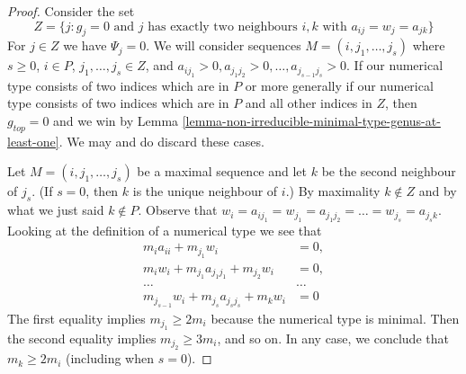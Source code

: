 \begin{proof}
\medskip\noindent
Consider the set
$$
Z = \{j : g_j = 0\text{ and }
j\text{ has exactly two neighbours }i, k\text{ with }
a_{ij} = w_j = a_{jk}\}
$$
For $j \in Z$ we have $\Psi_j = 0$. We will consider sequences
$M = (i, j_1, \ldots, j_s)$ where $s \geq 0$,
$i \in P$, $j_1, \ldots, j_s \in Z$, and
$a_{ij_1} > 0, a_{j_1j_2} > 0, \ldots, a_{j_{s - 1}j_s} > 0$.
If our numerical type consists of two indices which are in $P$
or more generally if our numerical type consists of
two indices which are in $P$ and all other indices in $Z$, then
$g_{top} = 0$ and we win by
Lemma \ref{lemma-non-irreducible-minimal-type-genus-at-least-one}.
We may and do discard these cases.

\medskip\noindent
Let $M = (i, j_1, \ldots, j_s)$ be a maximal sequence and let
$k$ be the second neighbour of $j_s$. (If $s = 0$, then $k$
is the unique neighbour of $i$.) By maximality $k \not \in Z$
and by what we just said $k \not \in P$. Observe that
$w_i = a_{ij_1} = w_{j_1} = a_{j_1j_2} = \ldots = w_{j_s} =
a_{j_sk}$. Looking at the definition
of a numerical type we see that
\begin{align*}
m_ia_{ii} + m_{j_1}w_i & = 0,\\
m_iw_i + m_{j_1}a_{j_1j_1} + m_{j_2}w_i & = 0,\\
\ldots & \ldots \\
m_{j_{s - 1}}w_i + m_{j_s}a_{j_sj_s} + m_kw_i & = 0
\end{align*}
The first equality implies $m_{j_1} \geq 2m_i$ because the
numerical type is minimal. Then the second equality implies
$m_{j_2} \geq 3m_i$, and so on. In any case, we conclude that
$m_k \geq 2m_i$ (including when $s = 0$).


\end{proof}
